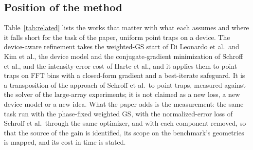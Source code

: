 \subsection{Position of the method}

Table~\ref{tab:related} lists the works that matter with what each assumes and where it falls short for the task of the paper, uniform point traps on a device. The device-aware refinement takes the weighted-GS start of Di Leonardo et al.\ and Kim et al., the device model and the conjugate-gradient minimization of Schroff et al., and the intensity-error cost of Harte et al., and it applies them to point traps on FFT bins with a closed-form gradient and a best-iterate safeguard. It is a transposition of the approach of Schroff et al.\ to point traps, measured against the solver of the large-array experiments; it is not claimed as a new loss, a new device model or a new idea. What the paper adds is the measurement: the same task run with the phase-fixed weighted GS, with the normalized-error loss of Schroff et al.\ through the same optimizer, and with each component removed, so that the source of the gain is identified, its scope on the benchmark's geometries is mapped, and its cost in time is stated.

